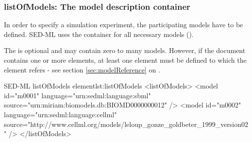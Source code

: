   \subsubsection{listOfModels: The model description container}
\label{sec:listOfModels}
In order to specify a simulation experiment, the participating models have to be defined. SED-ML uses the  container for all necessary models (). 

%

The  is optional and may contain zero to many models. However, if the \LoneVone document contains  one or more     elements,  at least one   element must be defined to which  the    element refers - see  section \ref{sec:modelReference} on .
%
\begin{myXmlLst}{SED-ML listOfModels element}{lst:listOfModels}
<listOfModels>
 <model id="m0001" language="urn:sedml:language:sbml" 
  source="urn:miriam:biomodels.db:BIOMD0000000012" />
 <model id="m0002" language="urn:sedml:language:cellml" 
  source="http://www.cellml.org/models/leloup_gonze_goldbeter_1999_version02" />
</listOfModels>
\end{myXmlLst}
%



